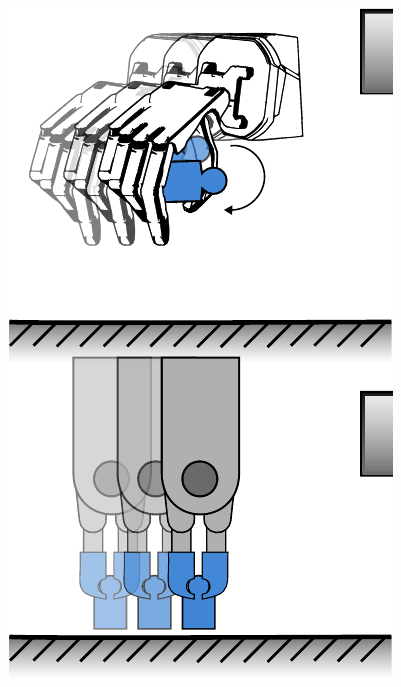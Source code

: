 \begin{figure}[h]
\begin{center}
\begin{minipage}{.24\linewidth}
			\includegraphics[width=.95\textwidth]{chapters/introduction/fig/pipeline-3.pdf}%
		\end{minipage}%
		\hfill%
		\begin{minipage}{.24\linewidth}
			\vspace{0pt}
			\centering

\end{minipage}
\end{center}
\end{figure}
